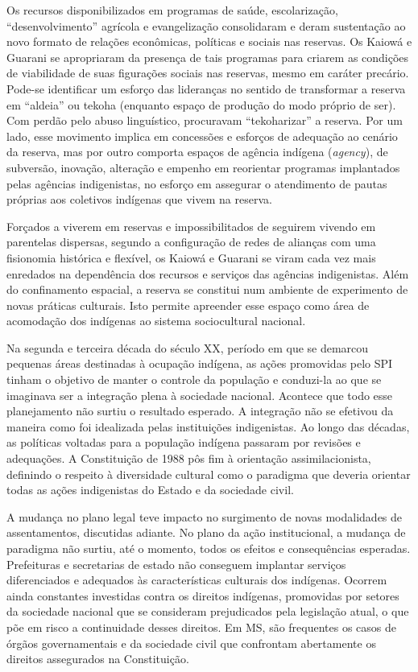 Os recursos disponibilizados em programas de saúde, escolarização,
``desenvolvimento'' agrícola e evangelização consolidaram e deram
sustentação ao novo formato de relações econômicas, políticas e sociais
nas reservas. Os Kaiowá e Guarani se apropriaram da presença de tais
programas para criarem as condições de viabilidade de suas figurações
sociais nas reservas, mesmo em caráter precário. Pode-se identificar um
esforço das lideranças no sentido de transformar a reserva em ``aldeia''
ou tekoha (enquanto espaço de produção do modo próprio de ser). Com
perdão pelo abuso linguístico, procuravam ``tekoharizar'' a reserva. Por
um lado, esse movimento implica em concessões e esforços de adequação
ao cenário da reserva, mas por outro comporta espaços de agência
indígena (\emph{agency}), de subversão, inovação, alteração e empenho em
reorientar programas implantados pelas agências indigenistas, no
esforço em assegurar o atendimento de pautas próprias aos coletivos
indígenas que vivem na reserva.  

Forçados a viverem em reservas e impossibilitados de seguirem vivendo em
parentelas dispersas, segundo a configuração de redes de alianças com
uma fisionomia histórica e flexível, os Kaiowá e Guarani se viram cada
vez mais enredados na dependência dos recursos e serviços das agências
indigenistas. Além do confinamento espacial, a reserva se constitui num
ambiente de experimento de novas práticas culturais. Isto permite
apreender esse espaço como área de acomodação dos indígenas ao sistema
sociocultural nacional.

Na segunda e terceira década do século XX, período em que se demarcou
pequenas áreas destinadas à ocupação indígena, as ações promovidas pelo
SPI tinham o objetivo de manter o controle da população e conduzi-la ao
que se imaginava ser a integração plena à sociedade nacional. Acontece
que todo esse planejamento não surtiu o resultado esperado. A
integração não se efetivou da maneira como foi idealizada pelas
instituições indigenistas. Ao longo das décadas, as políticas voltadas
para a população indígena passaram por revisões e adequações. A
Constituição de 1988 pôs fim à orientação assimilacionista, definindo o
respeito à diversidade cultural como o paradigma que deveria orientar
todas as ações indigenistas do Estado e da sociedade civil. 

A mudança no plano legal teve impacto no surgimento de novas modalidades
de assentamentos, discutidas adiante. No plano da ação institucional, a
mudança de paradigma não surtiu, até o momento, todos os efeitos e
consequências esperadas. Prefeituras e secretarias de estado não
conseguem implantar serviços diferenciados e adequados às
características culturais dos indígenas. Ocorrem ainda constantes
investidas contra os direitos indígenas, promovidas por setores da
sociedade nacional que se consideram prejudicados pela legislação
atual, o que põe em risco a continuidade desses direitos. Em MS, são
frequentes os casos de órgãos governamentais e da sociedade civil que
confrontam abertamente os direitos assegurados na Constituição.

